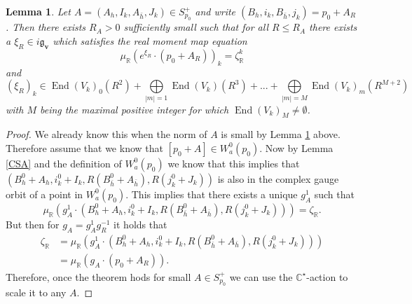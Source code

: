 \documentclass[10pt,a4paper]{amsart}
\newtheorem{lemma}{Lemma}
\newcommand{\C}{\mathbb{C}}
\newcommand{\End}{\operatorname{End}}
\newcommand{\R}{\mathbb{R}}
\begin{document}
\begin{lemma}\label{metric}
Let $A= (A_h,I_k,A_{\bar h}, J_k) \in S_{p_0}^+$ and write $(B_h,i_k,B_{\bar h},j_k) = p_0 +A_R$. Then there exists $R_A>0$ sufficiently small such that for all $R\le R_A$ there exists a $\xi_R \in i\mathfrak g_{\mathbf{v}}$ which satisfies the real moment map equation 
%
\begin{equation}
\mu_{\R}(e^{\xi_R}\cdot(p_0+A_R))_k = \zeta_{\R}^k
\end{equation}
%
and 
%
\begin{equation}\label{metricansatz}
(\xi_R)_k \in \End(V_k)_0(R^2) + \bigoplus\limits_{|m|= 1}\End(V_k)(R^3)+ ... + \bigoplus\limits_{|m|= M} \End(V_k)_m(R^{M+2})
\end{equation}
%
with $M$ being the maximal positive integer for which $\End(V_k)_M \neq \emptyset$.
\end{lemma}

\begin{proof}
We already know this when the norm of $A$ is small by Lemma \ref{metric} above. Therefore assume that we know that $[p_0+A]\in W_a^0(p_0)$. Now by Lemma \ref{CSA} and the definition of $W_a^0(p_0)$ we know that this implies that $(B_h^0+A_h,i_k^0+I_k,R(B_{\bar h}^0+A_{\bar h}), R(j_k^0+J_k))$ is also in the complex gauge orbit of a point in $W_a^0(p_0)$. This implies that there exists a unique $g^1_A$ such that 
%
\begin{equation*}
\mu_{\R}(g^1_A\cdot(B_h^0+A_h,i_k^0+I_k,R(B_{\bar h}^0+A_{\bar h}), R(j_k^0+J_k))) = \zeta_{\R}.
\end{equation*}
%
But then for $g_A = g^1_Ag^{-1}_R$ it holds that 
%
\begin{equation*}
\begin{split}
\zeta_{\R} &= \mu_{\R}(g^1_A\cdot(B_h^0+A_h,i_k^0+I_k,R(B_{\bar h}^0+A_{\bar h}), R(j_k^0+J_k))) \\
&= \mu_{\R}(g_A\cdot(p_0+A_R)).
\end{split}
\end{equation*}
%
Therefore, once the theorem hods for small $A\in S^+_{p_0}$ we can use the $\C^{\star}$-action to scale it to any $A$. 
\end{proof}
\end{document}

